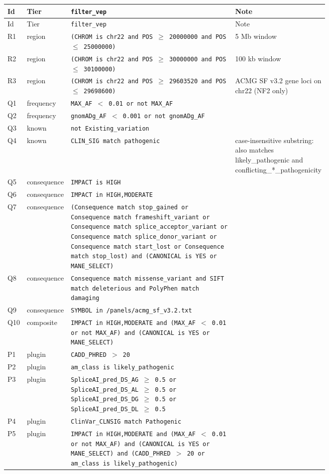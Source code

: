 \begin{longtable}{llp{0.55\linewidth}p{0.2\linewidth}}
\toprule
Id & Tier & \texttt{filter\_vep} & Note \\
\midrule
\endfirsthead
\toprule
Id & Tier & \texttt{filter\_vep} & Note \\
\midrule
\endhead
R1 & region & \texttt{(CHROM is chr22 and POS $\geq$ 20000000 and POS $\leq$ 25000000)} & 5 Mb window \\
R2 & region & \texttt{(CHROM is chr22 and POS $\geq$ 30000000 and POS $\leq$ 30100000)} & 100 kb window \\
R3 & region & \texttt{(CHROM is chr22 and POS $\geq$ 29603520 and POS $\leq$ 29698600)} & ACMG SF v3.2 gene loci on chr22 (NF2 only) \\
Q1 & frequency & \texttt{MAX\_AF $<$ 0.01 or not MAX\_AF} &  \\
Q2 & frequency & \texttt{gnomADg\_AF $<$ 0.001 or not gnomADg\_AF} &  \\
Q3 & known & \texttt{not Existing\_variation} &  \\
Q4 & known & \texttt{CLIN\_SIG match pathogenic} & case-insensitive substring: also matches likely\_pathogenic and conflicting\_*\_pathogenicity \\
Q5 & consequence & \texttt{IMPACT is HIGH} &  \\
Q6 & consequence & \texttt{IMPACT in HIGH,MODERATE} &  \\
Q7 & consequence & \texttt{(Consequence match stop\_gained or Consequence match frameshift\_variant or Consequence match splice\_acceptor\_variant or Consequence match splice\_donor\_variant or Consequence match start\_lost or Consequence match stop\_lost) and (CANONICAL is YES or MANE\_SELECT)} &  \\
Q8 & consequence & \texttt{Consequence match missense\_variant and SIFT match deleterious and PolyPhen match damaging} &  \\
Q9 & consequence & \texttt{SYMBOL in /panels/acmg\_sf\_v3.2.txt} &  \\
Q10 & composite & \texttt{IMPACT in HIGH,MODERATE and (MAX\_AF $<$ 0.01 or not MAX\_AF) and (CANONICAL is YES or MANE\_SELECT)} &  \\
P1 & plugin & \texttt{CADD\_PHRED $>$ 20} &  \\
P2 & plugin & \texttt{am\_class is likely\_pathogenic} &  \\
P3 & plugin & \texttt{SpliceAI\_pred\_DS\_AG $\geq$ 0.5 or SpliceAI\_pred\_DS\_AL $\geq$ 0.5 or SpliceAI\_pred\_DS\_DG $\geq$ 0.5 or SpliceAI\_pred\_DS\_DL $\geq$ 0.5} &  \\
P4 & plugin & \texttt{ClinVar\_CLNSIG match Pathogenic} &  \\
P5 & plugin & \texttt{IMPACT in HIGH,MODERATE and (MAX\_AF $<$ 0.01 or not MAX\_AF) and (CANONICAL is YES or MANE\_SELECT) and (CADD\_PHRED $>$ 20 or am\_class is likely\_pathogenic)} &  \\
\bottomrule
\end{longtable}
